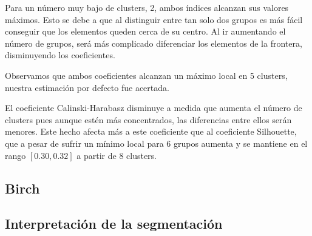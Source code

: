 \documentclass[a4paper, 20pt]{article}
\begin{document}
Para un número muy bajo de clusters, 2, ambos índices alcanzan sus valores máximos. Esto se debe a que al distinguir entre tan solo dos grupos es más fácil conseguir que los elementos queden cerca de su centro. Al ir aumentando el número de grupos, será más complicado diferenciar los elementos de la frontera, disminuyendo los coeficientes.

Observamos que ambos coeficientes alcanzan un máximo local en 5 clusters, nuestra estimación por defecto fue acertada.

El coeficiente Calinski-Harabasz disminuye a medida que aumenta el número de clusters pues aunque estén más concentrados, las diferencias entre ellos serán menores. Este hecho afecta más a este coeficiente que al coeficiente Silhouette, que a pesar de sufrir un mínimo local para 6 grupos aumenta y se mantiene en el rango $[0.30, 0.32]$ a partir de 8 clusters.

\subsection{Birch}


\subsection{Interpretación de la segmentación}

\newpage
\printbibliography

\end{document}
